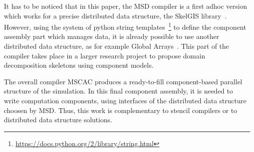 It has to be noticed that in this paper, the MSD compiler is a first adhoc version which works for a precise distributed data structure, the SkelGIS library~\cite{HeleneLS13,HeleneLS14,HeleneEuroPar14,CPE:CPE3494}. However, using the system of python string templates~\footnote{\url{https://docs.python.org/2/library/string.html}} to define the component assembly part which manages data, it is already possible to use another distributed data structure, as for example Global Arrays~\cite{Nieplocha:2006:AAP:1125980.1125985}. This part of the compiler takes place in a larger research project to propose domain decomposition skeletons using component models.

The overall compiler MSCAC produces a ready-to-fill component-based parallel structure of the simulation. In this final component assembly, it is needed to write computation components, using interfaces of the distributed data structure choosen by MSD. Thus, this work is complementary to stencil compilers or to distributed data structure solutions.